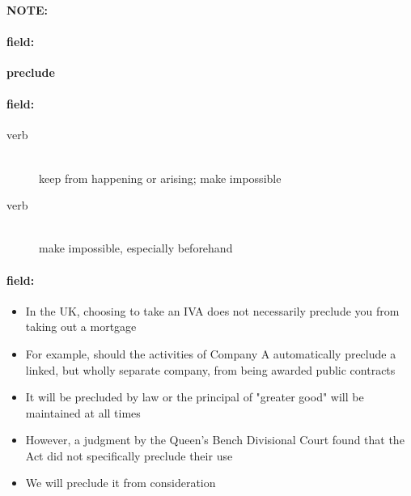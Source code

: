 \documentclass[12pt]{article}
\newenvironment{note}{\paragraph{NOTE:}}{}
\newenvironment{field}{\paragraph{field:}}{}
\begin{document}
\begin{note}
\begin{field}
\textbf{\large preclude}
\end{field}


\begin{field}
\begin{description}
\item[verb] \hfill \\ 
keep from happening or arising; make impossible

\item[verb] \hfill \\ 
make impossible, especially beforehand

\end{description}
\end{field}

\begin{field}
\begin{itemize}
\item In the UK, choosing to take an IVA does not necessarily preclude you from taking out a mortgage
\item For example, should the activities of Company A automatically preclude a linked, but wholly separate company, from being awarded public contracts
\item It will be precluded by law or the principal of "greater good" will be maintained at all times
\item However, a judgment by the Queen's Bench Divisional Court found that the Act did not specifically preclude their use
\item We will preclude it from consideration
\end{itemize}
\end{field}
\end{note}
\end{document}
